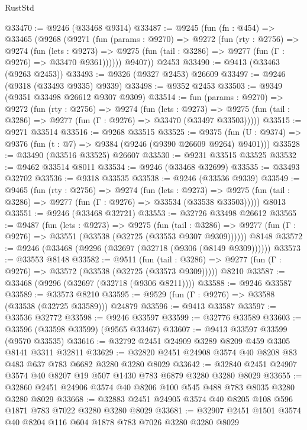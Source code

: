 \begin{lexlean}{RustStd}
\begin{coremodule}
@33470 := @9246 (@33468 @9314)
@33487 := @9245
    (fun (fn : @454) =>
    @33465
      (@9268
        (@9271
          (fun (params : @9270) =>
          @9272
            (fun (rty : @2756) =>
            @9274
              (fun (lets : @9273) =>
              @9275 (fun (tail : @3286) => @9277 (fun (Γ : @9276) => @33470 @9361))))))
        @9407))
    @2453
@33490 := @9413 (@33463 (@9263 @2453))
@33493 := @9326 (@9327 @2453) @26609
@33497 := @9246 (@9318 (@33493 @9335) @9339)
@33498 := @9352 @2453
@33503 := @9349 (@9351 @33498 @26612 @9307 @9309)
@33514 := fun (params : @9270) =>
  @9272
    (fun (rty : @2756) =>
    @9274
      (fun (lets : @9273) =>
      @9275 (fun (tail : @3286) => @9277 (fun (Γ : @9276) => @33470 (@33497 @33503)))))
@33515 := @9271 @33514
@33516 := @9268 @33515
@33525 := @9375
    (fun (U : @9374) => @9376 (fun (t : @7) => @9384 (@9246 (@9390 @26609 @9264) @9401)))
@33528 := @33490 (@33516 @33525) @26607
@33530 := @9231 @33515 @33525
@33532 := @9462 @33514 @8011
@33534 := @9246 (@33468 @32699)
@33535 := @33493 @32702
@33536 := @9318 @33535
@33538 := @9246 (@33536 @9339)
@33549 := @9465
    (fun (rty : @2756) =>
    @9274
      (fun (lets : @9273) =>
      @9275 (fun (tail : @3286) => @9277 (fun (Γ : @9276) => @33534 (@33538 @33503)))))
    @8013
@33551 := @9246 (@33468 @32721)
@33553 := @32726 @33498 @26612
@33565 := @9487
    (fun (lets : @9273) =>
    @9275
      (fun (tail : @3286) =>
      @9277 (fun (Γ : @9276) => @33551 (@33538 (@32725 (@33553 @9307 @9309))))))
    @8148
@33572 := @9246 (@33468 (@9296 (@32697 (@32718 (@9306 (@8149 @9309))))))
@33573 := @33553 @8148
@33582 := @9511
    (fun (tail : @3286) => @9277 (fun (Γ : @9276) => @33572 (@33538 (@32725 (@33573 @9309)))))
    @8210
@33587 := @33468 (@9296 (@32697 (@32718 (@9306 @8211))))
@33588 := @9246 @33587
@33589 := @33573 @8210
@33595 := @9529 (fun (Γ : @9276) => @33588 (@33538 (@32725 @33589))) @24879
@33596 := @9413 @33587
@33597 := @33536 @32772
@33598 := @9246 @33597
@33599 := @32776 @33589
@33603 := @33596 (@33598 @33599) (@9565 @33467)
@33607 := @9413 @33597 @33599 (@9570 @33535)
@33616 := @32792 @2451 @24909 @3289 @8209 @459 @3305 @8141 @3311 @32811
@33629 := @32820 @2451 @24908 @3574 @40 @8208 @83 @483 @637 @783 @6682 @3280 @3280 @8029
@33642 := @32840 @2451 @24907 @3574 @40 @8207 @19 @507 @1430 @783 @6879 @3280 @3280 @8029
@33655 := @32860 @2451 @24906 @3574 @40 @8206 @100 @545 @488 @783 @8035 @3280 @3280 @8029
@33668 := @32883 @2451 @24905 @3574 @40 @8205 @108 @596 @1871 @783 @7022 @3280 @3280 @8029
@33681 := @32907 @2451 @1501 @3574 @40 @8204 @116 @604 @1878 @783 @7026 @3280 @3280 @8029

\end{coremodule}
\end{lexlean}

